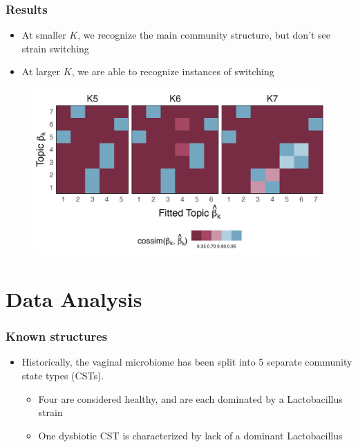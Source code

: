 \documentclass[hyperref={colorlinks=true, linkcolor=violet, citecolor=SeaGreen}]{beamer}
\begin{document}
\begin{frame}
  \frametitle{Results}
  \begin{itemize}
    \item At smaller $K$, we recognize the main community structure, but don't see strain switching
    \item At larger $K$, we are able to recognize instances of switching
  \end{itemize}
\begin{figure}
  \includegraphics[width=\textwidth]{equivalence_similarity_hm}
\end{figure}
\end{frame}

\section{Data Analysis}

\begin{frame}
  \frametitle{Known structures}
  \begin{itemize}
    \item Historically, the vaginal microbiome has been split into 5 separate
    community state types (CSTs).
    \begin{itemize}
      \item Four are considered healthy, and are each dominated by a Lactobacillus strain
      \item One dysbiotic CST is characterized by lack of a dominant Lactobacillus
    \end{itemize}
  \end{itemize}
\end{frame}
\end{document}
